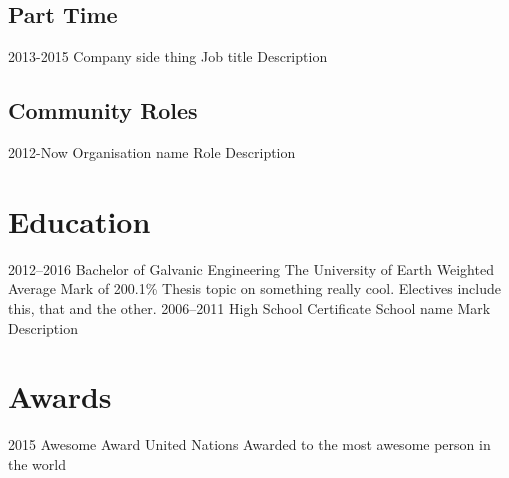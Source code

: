 \documentclass[print]{friggeri-cv}
\begin{document}
    \subsection{Part Time}
        \begin{entrylist}
            \entry
                {2013-2015}
                {Company} 
                {side thing}
                {Job title}
                {Description}
        \end{entrylist}
    \subsection{Community Roles}
        \begin{entrylist}
            \entry
                {2012-Now}
                {Organisation name} 
                {}
                {Role}
                {Description}
        \end{entrylist}

\section{Education}
    \begin{entrylist} 
        \entry
            {2012--2016}
            {Bachelor of Galvanic Engineering}
            {The University of Earth}
            {Weighted Average Mark of 200.1\%}
            {
                Thesis topic on something really cool. Electives include this, that and the other.
            }
        \entry
            {2006--2011}  
            {High School Certificate}
            {School name}
            {Mark} 
            {
                Description
            }
    \end{entrylist}

\section{Awards}
    \begin{entrylist}
        \entry
            {2015}
            {Awesome Award}
            {United Nations} 
            {} 
            {Awarded to the most awesome person in the world}
    \end{entrylist}
\end{document}
